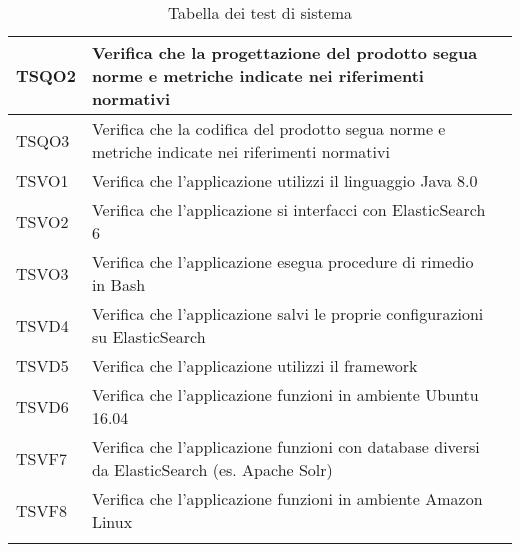 \begin{center}
\begin{longtable}{ | >{\centering\arraybackslash}m{2.5cm} | >{\raggedright\arraybackslash}m{9cm} | >{\centering\arraybackslash}m{3.5cm} | }
 				TSQO2 & Verifica che la progettazione del prodotto segua norme e metriche indicate nei riferimenti normativi
& \donetext{} \\ \hline
 				TSQO3 & Verifica che la codifica del prodotto segua norme e metriche indicate nei riferimenti normativi & \donetext{} \\ \hline
 				TSVO1 & Verifica che l'applicazione utilizzi il linguaggio Java 8.0 & \donetext{} \\ \hline
 				TSVO2 & Verifica che l'applicazione si interfacci con ElasticSearch 6 & \donetext{} \\ \hline
 				TSVO3 & Verifica che l'applicazione esegua procedure di rimedio in Bash & \donetext{} \\ \hline
 				TSVD4 & Verifica che l'applicazione salvi le proprie configurazioni su ElasticSearch & \donetext{} \\ \hline
 				TSVD5 & Verifica che l'applicazione utilizzi il framework \glossaryItem{Spring Batch}& \donetext{} \\ \hline
 				TSVD6 & Verifica che l'applicazione funzioni in ambiente Ubuntu 16.04 & \donetext{} \\ \hline
 				TSVF7 & Verifica che l'applicazione funzioni con database diversi da ElasticSearch (es. Apache Solr) & \donetext{} \\ \hline
 				TSVF8 & Verifica che l'applicazione funzioni in ambiente Amazon Linux & \donetext{} \\ \hline
			\caption[Test di sistema]{Tabella dei test di sistema}

			\end{longtable}
	
			\end{center}
					
